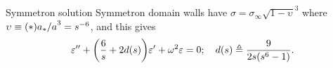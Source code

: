 \begin{frame}[t]{Symmetron solution}
    \smallskip
    Symmetron domain walls have $\sigma = \sigma_\infty \sqrt{1-\upsilon}^3$ where $\upsilon\equiv{\left( * \right)}{a_\ast/a}^3=s^{-6}$, and this gives
    \begin{equation}
        \varepsilon'' + {\left(  \frac{6}{s} + 2d(s) \right)} \varepsilon' + \omega^2 \varepsilon = 0; \quad d(s) \triangleq \frac{9}{2s(s^{6} -1)}.
    \end{equation}


\end{frame}
